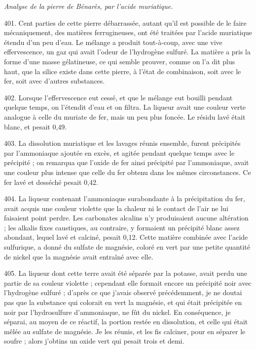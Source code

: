 \documentclass[a4paper, 11pt, oneside, polutonikogreek, french]{article}
\begin{document}
\begin{center}
\emph{Analyse de la pierre de Bénarès, par l'acide muriatique.}
\end{center}

401. Cent parties de cette pierre débarrassée, autant qu'il est possible de le faire mécaniquement, des matières ferrugineuses, ont été traitées par l'acide muriatique étendu d'un peu d'eau. Le mélange a produit tout-à-coup, avec une vive effervescence, un gaz qui avait l'odeur de l'hydrogène sulfuré. La matière a pris la forme d'une masse gélatineuse, ce qui semble prouver, comme on l'a dit plus haut, que la silice existe dans cette pierre, à l'état de combinaison, soit avec le fer, soit avec d'autres substances.

402. Lorsque l'effervescence eut cessé, et que le mélange eut bouilli pendant quelque temps, on l'étendit d'eau et on filtra. La liqueur avait une couleur verte analogue à celle du muriate de fer, mais un peu plus foncée. Le résidu lavé était blanc, et pesait 0,49.

403. La dissolution muriatique et les lavages réunis ensemble, furent précipités par l'ammoniaque ajoutée en excès, et agitée pendant quelque temps avec le précipité ; on remarqua que l'oxide de fer ainsi précipité par l'ammoniaque, avait une couleur plus intense que celle du fer obtenu dans les mêmes circonstances. Ce fer lavé et desséché pesait 0,42.

404. La liqueur contenant l'ammoniaque surabondante à la précipitation du fer, avait acquis une couleur violette que la chaleur ni le contact de l'air ne lui faisaient point perdre. Les carbonates alcalins n'y produisaient aucune altération ; les alkalis fixes caustiques, au contraire, y formaient un précipité blanc assez abondant, lequel lavé et calciné, pesait 0,12. Cette matière combinée avec l'acide sulfurique, a donné du sulfate de magnésie, coloré en vert par une petite quantité de nickel que la magnésie avait entraîné avec elle.

405. La liqueur dont cette terre avait été séparée par la potasse, avait perdu une partie de sa couleur violette ; cependant elle formait encore un précipité noir avec l'hydrogène sulfuré ; d'après ce que j'avais observé précédemment, je ne doutai pas que la substance qui colorait en vert la magnésie, et qui était précipitée en noir par l'hydrosulfure d'ammoniaque, ne fût du nickel. En conséquence, je séparai, au moyen de ce réactif, la portion restée en dissolution, et celle qui était mêlée au sulfate de magnésie. Je les réunis, et les fis calciner, pour en séparer le soufre ; alors j'obtins un oxide vert qui pesait trois et demi.
\end{document}
